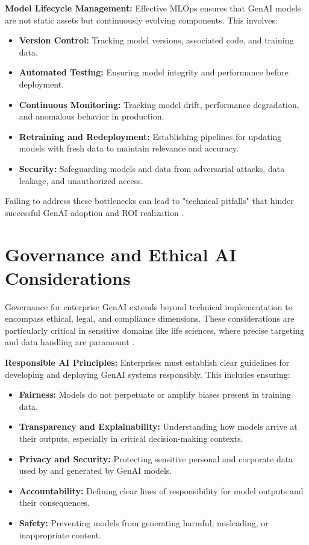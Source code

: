 \documentclass[10pt,twocolumn,letterpaper]{article}
\begin{document}
\textbf{Model Lifecycle Management:} Effective MLOps ensures that GenAI models are not static assets but continuously evolving components. This involves:
\begin{itemize}
  \item \textbf{Version Control:} Tracking model versions, associated code, and training data.
  \item \textbf{Automated Testing:} Ensuring model integrity and performance before deployment.
  \item \textbf{Continuous Monitoring:} Tracking model drift, performance degradation, and anomalous behavior in production.
  \item \textbf{Retraining and Redeployment:} Establishing pipelines for updating models with fresh data to maintain relevance and accuracy.
  \item \textbf{Security:} Safeguarding models and data from adversarial attacks, data leakage, and unauthorized access.
\end{itemize}

Failing to address these bottlenecks can lead to "technical pitfalls" that hinder successful GenAI adoption and ROI realization \cite{openalex_w4400993506}.


\section{Governance and Ethical AI Considerations}


Governance for enterprise GenAI extends beyond technical implementation to encompass ethical, legal, and compliance dimensions. These considerations are particularly critical in sensitive domains like life sciences, where precise targeting and data handling are paramount \cite{crossref_10_2139_ssrn_6374778}.

\textbf{Responsible AI Principles:} Enterprises must establish clear guidelines for developing and deploying GenAI systems responsibly. This includes ensuring:
\begin{itemize}
  \item \textbf{Fairness:} Models do not perpetuate or amplify biases present in training data.
  \item \textbf{Transparency and Explainability:} Understanding how models arrive at their outputs, especially in critical decision-making contexts.
  \item \textbf{Privacy and Security:} Protecting sensitive personal and corporate data used by and generated by GenAI models.
  \item \textbf{Accountability:} Defining clear lines of responsibility for model outputs and their consequences.
  \item \textbf{Safety:} Preventing models from generating harmful, misleading, or inappropriate content.
\end{itemize}
\end{document}
